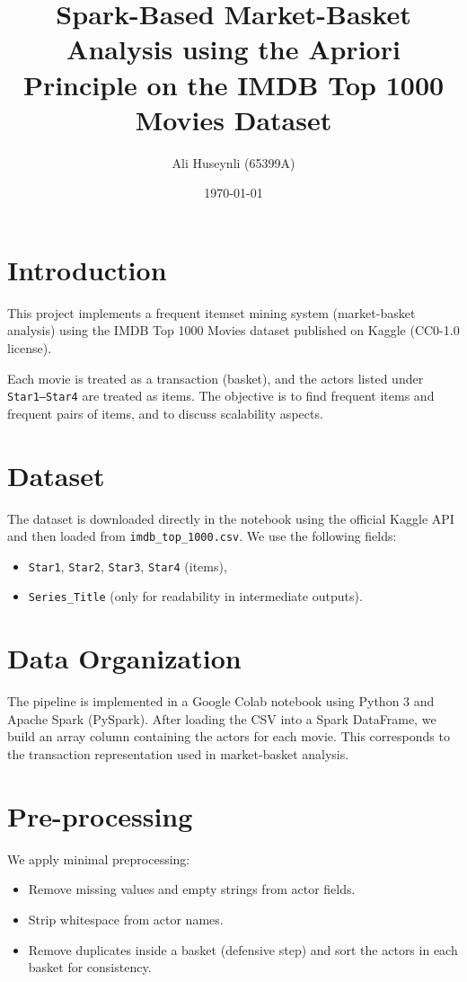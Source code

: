 \documentclass[11pt,a4paper]{article}
\title{Spark-Based Market-Basket Analysis using the Apriori Principle on the IMDB Top 1000 Movies Dataset}
\author{Ali Huseynli (65399A)}
\date{\today}
\begin{document}
\maketitle

\section{Introduction}
This project implements a frequent itemset mining system (market-basket analysis) using the IMDB Top 1000 Movies dataset published on Kaggle (CC0-1.0 license).

Each movie is treated as a transaction (basket), and the actors listed under \texttt{Star1--Star4} are treated as items. The objective is to find frequent items and frequent pairs of items, and to discuss scalability aspects.

\section{Dataset}
The dataset is downloaded directly in the notebook using the official Kaggle API and then loaded from \texttt{imdb\_top\_1000.csv}. We use the following fields:
\begin{itemize}
    \item \texttt{Star1}, \texttt{Star2}, \texttt{Star3}, \texttt{Star4} (items),
    \item \texttt{Series\_Title} (only for readability in intermediate outputs).
\end{itemize}

\section{Data Organization}
The pipeline is implemented in a Google Colab notebook using Python 3 and Apache Spark (PySpark). After loading the CSV into a Spark DataFrame, we build an array column containing the actors for each movie. This corresponds to the transaction representation used in market-basket analysis.

\section{Pre-processing}
We apply minimal preprocessing:
\begin{itemize}
    \item Remove missing values and empty strings from actor fields.
    \item Strip whitespace from actor names.
    \item Remove duplicates inside a basket (defensive step) and sort the actors in each basket for consistency.
\end{itemize}
\end{document}
